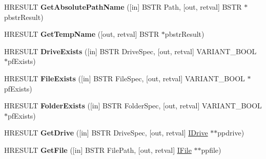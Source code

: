 \begin{DoxyCompactItemize}
H\+R\+E\+S\+U\+LT {\bfseries Get\+Absolute\+Path\+Name} (\mbox{[}in\mbox{]} B\+S\+TR Path, \mbox{[}out, retval\mbox{]} B\+S\+TR $\ast$pbstr\+Result)
\item 
\mbox{\label{interface_scripting_1_1_i_file_system_a4340edd8af0d14812b4c7aaf41631a9c}} 
H\+R\+E\+S\+U\+LT {\bfseries Get\+Temp\+Name} (\mbox{[}out, retval\mbox{]} B\+S\+TR $\ast$pbstr\+Result)
\item 
\mbox{\label{interface_scripting_1_1_i_file_system_abb36b0a48f8472edb6211db13020ce0c}} 
H\+R\+E\+S\+U\+LT {\bfseries Drive\+Exists} (\mbox{[}in\mbox{]} B\+S\+TR Drive\+Spec, \mbox{[}out, retval\mbox{]} V\+A\+R\+I\+A\+N\+T\+\_\+\+B\+O\+OL $\ast$pf\+Exists)
\item 
\mbox{\label{interface_scripting_1_1_i_file_system_af411dd91b35b97d08152258b161e4b08}} 
H\+R\+E\+S\+U\+LT {\bfseries File\+Exists} (\mbox{[}in\mbox{]} B\+S\+TR File\+Spec, \mbox{[}out, retval\mbox{]} V\+A\+R\+I\+A\+N\+T\+\_\+\+B\+O\+OL $\ast$pf\+Exists)
\item 
\mbox{\label{interface_scripting_1_1_i_file_system_a3ec6afb0ba580f4165da2da1a6304b5e}} 
H\+R\+E\+S\+U\+LT {\bfseries Folder\+Exists} (\mbox{[}in\mbox{]} B\+S\+TR Folder\+Spec, \mbox{[}out, retval\mbox{]} V\+A\+R\+I\+A\+N\+T\+\_\+\+B\+O\+OL $\ast$pf\+Exists)
\item 
\mbox{\label{interface_scripting_1_1_i_file_system_a06862b7f91cd2d72ec40c11e23c7d823}} 
H\+R\+E\+S\+U\+LT {\bfseries Get\+Drive} (\mbox{[}in\mbox{]} B\+S\+TR Drive\+Spec, \mbox{[}out, retval\mbox{]} \hyperlink{interface_scripting_1_1_i_drive}{I\+Drive} $\ast$$\ast$ppdrive)
\item 
\mbox{\label{interface_scripting_1_1_i_file_system_aee78159543bee03bcc2a33be63eb051f}} 
H\+R\+E\+S\+U\+LT {\bfseries Get\+File} (\mbox{[}in\mbox{]} B\+S\+TR File\+Path, \mbox{[}out, retval\mbox{]} \hyperlink{interface_scripting_1_1_i_file}{I\+File} $\ast$$\ast$ppfile)
\item 
\mbox{\label{interface_scripting_1_1_i_file_system_a0fc2c8ece34b2870c02ff9c824b5b753}} 

\end{DoxyCompactItemize}
